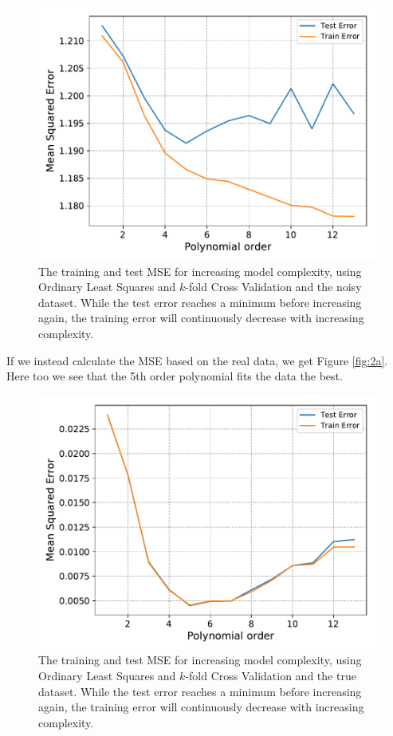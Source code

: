 \documentclass[a4paper,10pt,english]{article}
\begin{document}
 \begin{figure}[H]
 	\centering
 	\includegraphics[scale=0.6]{c_OLSerr_train_test_vs_pdegree.pdf}
 	\caption{The training and test MSE for increasing model complexity, using Ordinary Least Squares and $k$-fold Cross Validation and the noisy dataset. While the test error reaches a minimum before increasing again, the training error will continuously decrease with increasing complexity.}
 	\label{fig:2}
 \end{figure}

If we instead calculate the MSE based on the real data, we get Figure \ref{fig:2a}. Here too we see that the 5th order polynomial fits the data the best.
 \begin{figure}[H]
	\centering
	\includegraphics[scale=0.6]{c_OLSerr_train_test_vs_pdegree_no_noise.pdf}
	\caption{The training and test MSE for increasing model complexity, using Ordinary Least Squares and $k$-fold Cross Validation and the true dataset. While the test error reaches a minimum before increasing again, the training error will continuously decrease with increasing complexity.}
	\label{fig:2b}
\end{figure}
\end{document}
